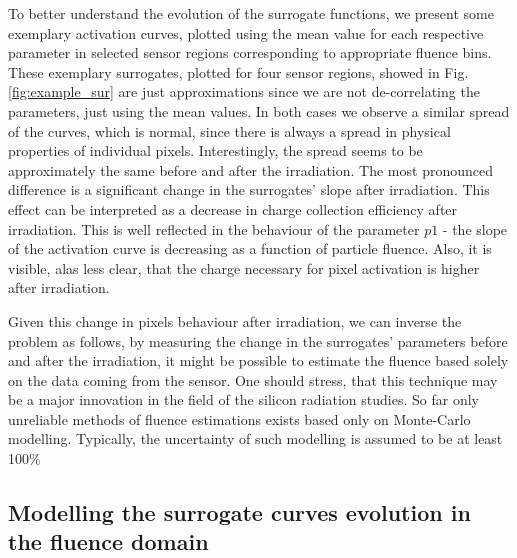 To better understand the evolution of the surrogate functions, we present some exemplary activation curves, plotted using the mean value for each respective parameter in selected sensor regions corresponding to appropriate fluence bins.
These exemplary surrogates, plotted for four sensor regions, showed in Fig. \ref{fig:example_sur} are just approximations since we are not de-correlating the parameters, just using the mean values.
In both cases we observe a similar spread of the curves, which is normal, since there is always a spread in physical properties of individual pixels. Interestingly, the spread seems to be approximately the same before and after the irradiation. The most pronounced difference is a significant change in the surrogates' slope after irradiation. This effect can be interpreted as a decrease in charge collection efficiency after irradiation. This is well reflected in the behaviour of the parameter $p1$ - the slope of the activation curve is decreasing as a function of particle fluence. Also, it is visible, alas less clear, that the charge necessary for pixel activation is higher after irradiation. 

Given this change in pixels behaviour after irradiation, we can inverse the problem as follows, by measuring the change in the surrogates' parameters before and after the irradiation, it might be possible to estimate the fluence based solely on the data coming from the sensor. One should stress, that this technique may be a major innovation in the field of the silicon radiation studies. So far only unreliable methods of fluence estimations exists based only on Monte-Carlo modelling. Typically, the uncertainty of such modelling is assumed to be at least 100$\%$

\subsection{Modelling the surrogate curves evolution in the fluence domain}

